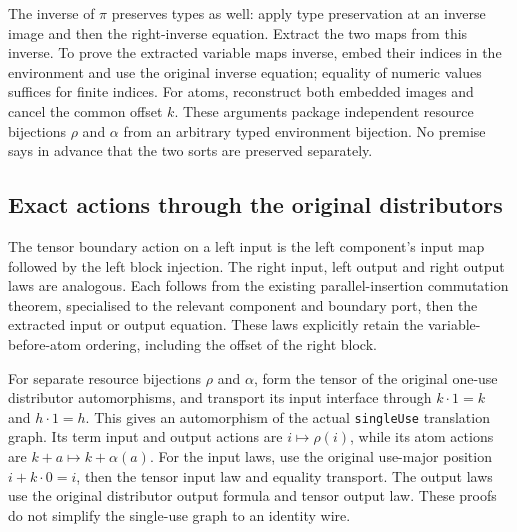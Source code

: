 
The inverse of $\pi$ preserves types as well: apply type preservation at
an inverse image and then the right-inverse equation. Extract the two maps from
this inverse. To prove the extracted variable maps inverse, embed their indices
in the environment and use the original inverse equation; equality of numeric
values suffices for finite indices. For atoms, reconstruct both embedded images
and cancel the common offset $k$. These arguments package independent resource
bijections $\rho$ and $\alpha$ from an arbitrary typed environment bijection.
No premise says in advance that the two sorts are preserved separately.


\subsection{Exact actions through the original distributors}
The tensor boundary action on a left input is the left component's input map
followed by the left block injection. The right input, left output and right
output laws are analogous. Each follows from the existing parallel-insertion
commutation theorem, specialised to the relevant component and boundary port,
then the extracted input or output equation. These laws explicitly retain the
variable-before-atom ordering, including the offset of the right block.


For separate resource bijections $\rho$ and $\alpha$, form the tensor of the
original one-use distributor automorphisms, and transport its input interface
through $k\cdot1=k$ and $h\cdot1=h$. This gives an automorphism of the actual
\texttt{singleUse} translation graph. Its term input and output actions are
$i\mapsto\rho(i)$, while its atom actions are $k+a\mapsto k+\alpha(a)$.
For the input laws, use the original use-major position $i+k\cdot0=i$,
then the tensor input law and equality transport. The output laws use the
original distributor output formula and tensor output law. These proofs do not
simplify the single-use graph to an identity wire.

